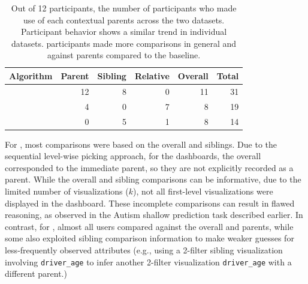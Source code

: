 \begin{table}[h!]
\hspace{-10pt}
\centering
	\begin{tabular}{|l|rrrr|r|}
	\hline
	 Algorithm   &    Parent &   Sibling &   Relative & Overall &   Total \\
	\hline
	 \system     &    \cellcolor{blue!25} 12 &       8 &     0 &  11 &      \cellcolor{blue!25} 31 \\
	 \cluster     &         4 &        0 &         7 &          8 &      19 \\
	 \BFS         &         0 &        5 &         1 &          8 &      14 \\
	\hline
	\end{tabular}
\caption{Out of 12 participants, the number of participants who made use of each contextual parents across the two datasets. Participant behavior shows a similar trend in individual datasets. \system participants made more comparisons in general and against parents compared to the baseline.}
\label{table:contextualReferenceCount}
\end{table}
\par For \BFS, most comparisons were based on the overall and siblings. Due to the sequential level-wise picking approach, for the \BFS dashboards, the overall corresponded to the immediate parent, so they are not explicitly recorded as a parent. While the overall and sibling comparisons can be informative, due to the limited number of visualizations ($k$), not all first-level visualizations were displayed in the dashboard. These incomplete comparisons can result in flawed reasoning, as observed in the Autism shallow prediction task described earlier. In contrast, for \system, almost all users compared against the overall and parents, while some also exploited sibling comparison information to make weaker guesses for less-frequently observed attributes (e.g., using a 2-filter sibling visualization involving \texttt{driver\_age} to infer another 2-filter visualization \texttt{driver\_age} with a different parent.)
